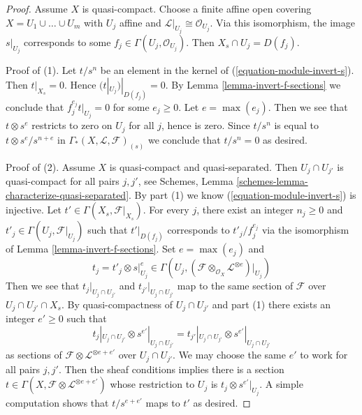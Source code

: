 \begin{proof}
Assume $X$ is quasi-compact. Choose a finite affine open covering
$X = U_1 \cup \ldots \cup U_m$ with $U_j$ affine and
$\mathcal{L}|_{U_j} \cong \mathcal{O}_{U_j}$. Via this isomorphism,
the image $s|_{U_j}$ corresponds to some
$f_j \in \Gamma(U_j, \mathcal{O}_{U_j})$. Then
$X_s \cap U_j = D(f_j)$.

\medskip\noindent
Proof of (1). Let $t/s^n$ be an element in the kernel of
(\ref{equation-module-invert-s}). Then $t|_{X_s} = 0$.
Hence $(t|_{U_j})|_{D(f_j)} = 0$. By
Lemma \ref{lemma-invert-f-sections} we conclude that
$f_j^{e_j} t|_{U_j} = 0$ for some
$e_j \geq 0$. Let $e = \max(e_j)$. Then we see that $t \otimes s^e$
restricts to zero on $U_j$ for all $j$, hence is zero. Since $t/s^n$
is equal to $t \otimes s^e/s^{n + e}$ in
$\Gamma_*(X, \mathcal{L}, \mathcal{F})_{(s)}$ we conclude that $t/s^n = 0$
as desired.

\medskip\noindent
Proof of (2). Assume $X$ is quasi-compact and quasi-separated.
Then $U_j \cap U_{j'}$ is quasi-compact for all pairs $j, j'$, see
Schemes, Lemma \ref{schemes-lemma-characterize-quasi-separated}.
By part (1) we know (\ref{equation-module-invert-s}) is injective.
Let $t' \in \Gamma(X_s, \mathcal{F}|_{X_s})$. For every $j$, there exist an
integer $n_j \geq 0$ and $t'_j \in \Gamma(U_j, \mathcal{F}|_{U_j})$ such that
$t'|_{D(f_j)}$ corresponds to $t'_j/f_j^{e_j}$
via the isomorphism of Lemma \ref{lemma-invert-f-sections}.
Set $e = \max(e_j)$ and
$$
t_j = t'_j \otimes s|_{U_j}^e \in
\Gamma(U_j,
(\mathcal{F} \otimes_{\mathcal{O}_X} \mathcal{L}^{\otimes e})|_{U_j})
$$
Then we see that $t_j|_{U_j \cap U_{j'}}$ and $t_{j'}|_{U_j \cap U_{j'}}$
map to the same section of $\mathcal{F}$ over $U_j \cap U_{j'} \cap X_s$.
By quasi-compactness of $U_j \cap U_{j'}$ and part (1) there exists an
integer $e' \geq 0$ such that
$$
t_j|_{U_j \cap U_{j'}} \otimes s^{e'}|_{U_j \cap U_{j'}} =
t_{j'}|_{U_j \cap U_{j'}} \otimes s^{e'}|_{U_j \cap U_{j'}}
$$
as sections of $\mathcal{F} \otimes \mathcal{L}^{\otimes e + e'}$ over
$U_j \cap U_{j'}$. We may choose the same $e'$ to work for all pairs
$j, j'$. Then the sheaf conditions implies there is a section
$t \in \Gamma(X, \mathcal{F} \otimes \mathcal{L}^{\otimes e + e'})$
whose restriction to $U_j$ is $t_j \otimes s^{e'}|_{U_j}$.
A simple computation shows that $t/s^{e + e'}$ maps to $t'$
as desired.
\end{proof}

